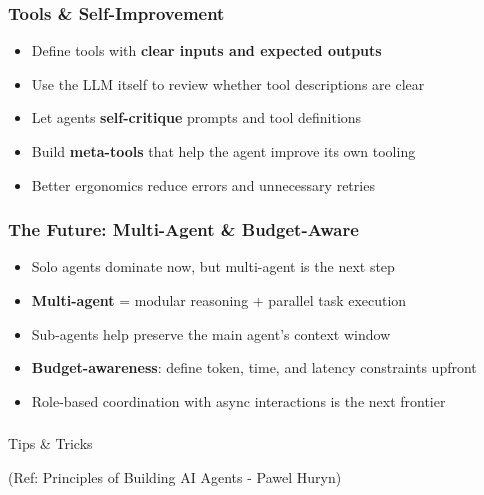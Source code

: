\begin{frame}[fragile]\frametitle{Tools \& Self-Improvement}
    \begin{itemize}
        \item Define tools with \textbf{clear inputs and expected outputs}
        \item Use the LLM itself to review whether tool descriptions are clear
        \item Let agents \textbf{self-critique} prompts and tool definitions
        \item Build \textbf{meta-tools} that help the agent improve its own tooling
        \item Better ergonomics reduce errors and unnecessary retries
    \end{itemize}
\end{frame}

\begin{frame}[fragile]\frametitle{The Future: Multi-Agent \& Budget-Aware}
    \begin{itemize}
        \item Solo agents dominate now, but multi-agent is the next step
        \item \textbf{Multi-agent} = modular reasoning + parallel task execution
        \item Sub-agents help preserve the main agent's context window
        \item \textbf{Budget-awareness}: define token, time, and latency constraints upfront
        \item Role-based coordination with async interactions is the next frontier
    \end{itemize}
\end{frame}

\begin{frame}[fragile]\frametitle{}
\begin{center}
{\Large Tips \& Tricks}

{\tiny (Ref: Principles of Building AI Agents - Pawel Huryn)}
\end{center}
\end{frame}

